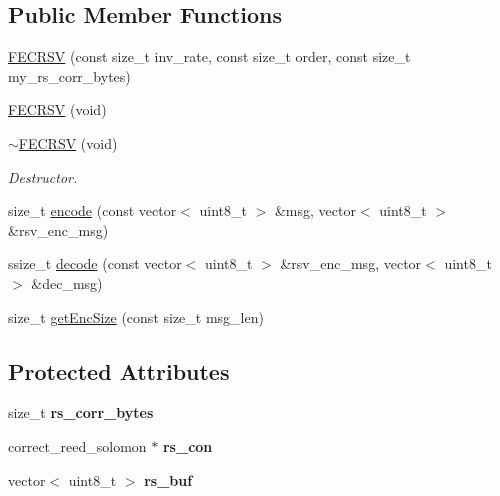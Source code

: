 \subsection*{Public Member Functions}
\begin{DoxyCompactItemize}
\item 
\hyperlink{classFECRSV_ac7d8897c02cdb41a46d895b14bfb976f}{F\+E\+C\+R\+SV} (const size\+\_\+t inv\+\_\+rate, const size\+\_\+t order, const size\+\_\+t my\+\_\+rs\+\_\+corr\+\_\+bytes)
\item 
\hyperlink{classFECRSV_abe3a37b51594a1fd3ce2ea92c744575a}{F\+E\+C\+R\+SV} (void)
\item 
\mbox{\label{classFECRSV_a5bfac8acff2c5604b4aa78417cceec5b}} 
\hyperlink{classFECRSV_a5bfac8acff2c5604b4aa78417cceec5b}{$\sim$\+F\+E\+C\+R\+SV} (void)
\begin{DoxyCompactList}\small\item\em Destructor. \end{DoxyCompactList}\item 
size\+\_\+t \hyperlink{classFECRSV_ac9bd3fe4c494067e6f24a1287b0c562e}{encode} (const vector$<$ uint8\+\_\+t $>$ \&msg, vector$<$ uint8\+\_\+t $>$ \&rsv\+\_\+enc\+\_\+msg)
\item 
ssize\+\_\+t \hyperlink{classFECRSV_a4781900bd59579d7a380687c59179ae5}{decode} (const vector$<$ uint8\+\_\+t $>$ \&rsv\+\_\+enc\+\_\+msg, vector$<$ uint8\+\_\+t $>$ \&dec\+\_\+msg)
\item 
size\+\_\+t \hyperlink{classFECRSV_a62fb01c152dad2e043ae75bbacfd928c}{get\+Enc\+Size} (const size\+\_\+t msg\+\_\+len)
\end{DoxyCompactItemize}
\subsection*{Protected Attributes}
\begin{DoxyCompactItemize}
\item 
\mbox{\label{classFECRSV_abb99cf759979bc02ce129a4ba59206d3}} 
size\+\_\+t {\bfseries rs\+\_\+corr\+\_\+bytes}
\item 
\mbox{\label{classFECRSV_a6032e72eb4d7e2256009769bba63b9b7}} 
correct\+\_\+reed\+\_\+solomon $\ast$ {\bfseries rs\+\_\+con}
\item 
\mbox{\label{classFECRSV_a3bab792933973acef7689ea4dd490af5}} 
vector$<$ uint8\+\_\+t $>$ {\bfseries rs\+\_\+buf}
\end{DoxyCompactItemize}
